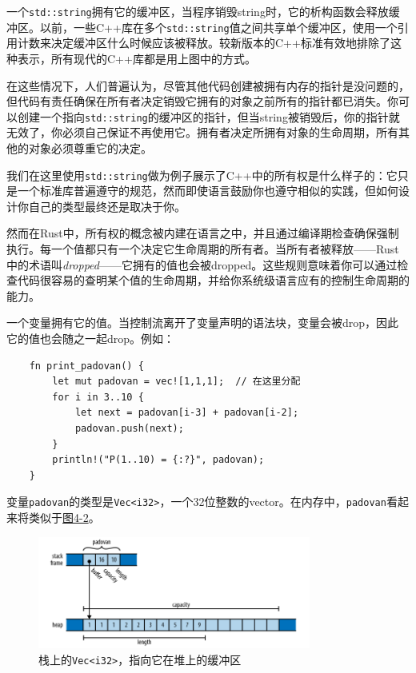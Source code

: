 一个\texttt{std::string}拥有它的缓冲区，当程序销毁string时，它的析构函数会释放缓冲区。以前，一些C++库在多个\texttt{std::string}值之间共享单个缓冲区，使用一个引用计数来决定缓冲区什么时候应该被释放。较新版本的C++标准有效地排除了这种表示，所有现代的C++库都是用上图中的方式。

在这些情况下，人们普遍认为，尽管其他代码创建被拥有内存的指针是没问题的，但代码有责任确保在所有者决定销毁它拥有的对象之前所有的指针都已消失。你可以创建一个指向\texttt{std::string}的缓冲区的指针，但当string被销毁后，你的指针就无效了，你必须自己保证不再使用它。拥有者决定所拥有对象的生命周期，所有其他的对象必须尊重它的决定。

我们在这里使用\texttt{std::string}做为例子展示了C++中的所有权是什么样子的：它只是一个标准库普遍遵守的规范，然而即使语言鼓励你也遵守相似的实践，但如何设计你自己的类型最终还是取决于你。

然而在Rust中，所有权的概念被内建在语言之中，并且通过编译期检查确保强制执行。每一个值都只有一个决定它生命周期的所有者。当所有者被释放——Rust中的术语叫\emph{dropped}——它拥有的值也会被dropped。这些规则意味着你可以通过检查代码很容易的查明某个值的生命周期，并给你系统级语言应有的控制生命周期的能力。

一个变量拥有它的值。当控制流离开了变量声明的语法块，变量会被drop，因此它的值也会随之一起drop。例如：
\begin{verbatim}
    fn print_padovan() {
        let mut padovan = vec![1,1,1];  // 在这里分配
        for i in 3..10 {
            let next = padovan[i-3] + padovan[i-2];
            padovan.push(next);
        }
        println!("P(1..10) = {:?}", padovan);
    }
\end{verbatim}

变量\texttt{padovan}的类型是\texttt{Vec<i32>}，一个32位整数的vector。在内存中，\texttt{padovan}看起来将类似于\hyperref[f4-2]{图4-2}。

\begin{figure}[htbp]
    \centering
    \includegraphics[width=0.8\textwidth]{../img/f4-2.png}
    \caption{栈上的\texttt{Vec<i32>}，指向它在堆上的缓冲区}
    \label{f4-2}
\end{figure}

